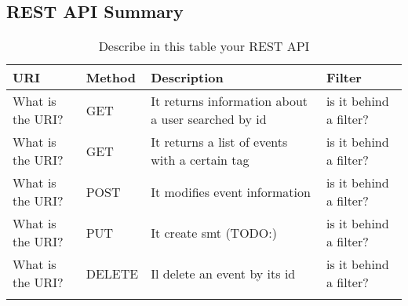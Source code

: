 \subsection{REST API Summary}


\begin{longtable}{|p{}|p{} |p{}|p{}|} 
\hline
\textbf{URI} & \textbf{Method} & \textbf{Description} & \textbf{Filter} \\\hline
What is the URI? & GET & It returns information about a user searched by id & is it behind a filter?\\\hline
What is the URI? & GET & It returns a list of events with a certain tag & is it behind a filter?\\\hline
What is the URI? & POST & It modifies event information & is it behind a filter?\\\hline
What is the URI? & PUT & It create smt (TODO:) & is it behind a filter?\\\hline
What is the URI? & DELETE & Il delete an event by its id & is it behind a filter?\\\hline
\caption{Describe in this table your REST API}
\label{tab:termGlossary}
\end{longtable}